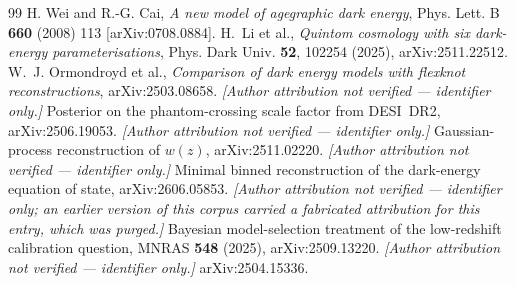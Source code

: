 \documentclass[11pt]{article}
\begin{document}
\begin{thebibliography}{99}
 H. Wei and R.-G. Cai, \emph{A new model of agegraphic dark energy}, Phys. Lett. B \textbf{660} (2008) 113 [arXiv:0708.0884].
 H.~Li et al., \emph{Quintom cosmology with six dark-energy parameterisations}, Phys. Dark Univ. \textbf{52}, 102254 (2025), arXiv:2511.22512.
 W.~J. Ormondroyd et al., \emph{Comparison of dark energy models with flexknot reconstructions}, arXiv:2503.08658.
 \emph{[Author attribution not verified --- identifier only.]} Posterior on the phantom-crossing scale factor from DESI~DR2, arXiv:2506.19053.
 \emph{[Author attribution not verified --- identifier only.]} Gaussian-process reconstruction of $w(z)$, arXiv:2511.02220.
 \emph{[Author attribution not verified --- identifier only.]} Minimal binned reconstruction of the dark-energy equation of state, arXiv:2606.05853.
 \emph{[Author attribution not verified --- identifier only; an earlier version of this corpus carried a fabricated attribution for this entry, which was purged.]} Bayesian model-selection treatment of the low-redshift calibration question, MNRAS \textbf{548} (2025), arXiv:2509.13220.
 \emph{[Author attribution not verified --- identifier only.]} arXiv:2504.15336.
\end{thebibliography}
\end{document}

